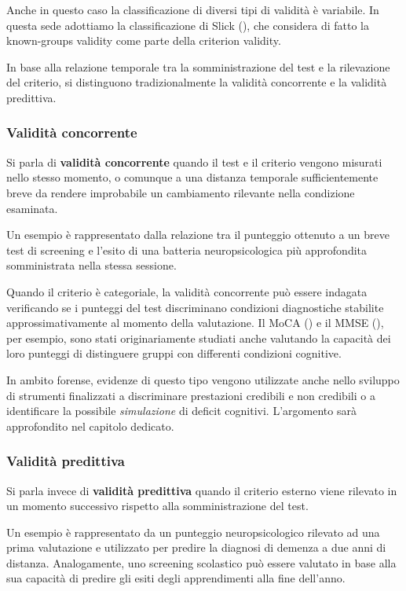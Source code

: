 \documentclass[
  italian,
  letterpaper,
  paper=A4,
  headinclude=on,
  footinclude=on,
  12pt]{scrbook}
\begin{document}
Anche in questo caso la classificazione di diversi tipi di validità è
variabile. In questa sede adottiamo la classificazione di Slick
(\cite{slick2006psychometrics}), che considera di fatto la known-groups
validity come parte della criterion validity.

In base alla relazione temporale tra la somministrazione del test e la
rilevazione del criterio, si distinguono tradizionalmente la validità
concorrente e la validità predittiva.

\subsubsection{Validità concorrente}\label{validituxe0-concorrente}

Si parla di \textbf{validità concorrente} quando il test e il criterio
vengono misurati nello stesso momento, o comunque a una distanza
temporale sufficientemente breve da rendere improbabile un cambiamento
rilevante nella condizione esaminata.

Un esempio è rappresentato dalla relazione tra il punteggio ottenuto a
un breve test di screening e l'esito di una batteria neuropsicologica
più approfondita somministrata nella stessa sessione.

Quando il criterio è categoriale, la validità concorrente può essere
indagata verificando se i punteggi del test discriminano condizioni
diagnostiche stabilite approssimativamente al momento della valutazione.
Il MoCA (\cite{nasreddine2005montreal}) e il MMSE
(\cite{folstein1975mini}), per esempio, sono stati originariamente
studiati anche valutando la capacità dei loro punteggi di distinguere
gruppi con differenti condizioni cognitive.

In ambito forense, evidenze di questo tipo vengono utilizzate anche
nello sviluppo di strumenti finalizzati a discriminare prestazioni
credibili e non credibili o a identificare la possibile
\emph{simulazione} di deficit cognitivi. L'argomento sarà approfondito
nel capitolo dedicato.

\subsubsection{Validità predittiva}\label{validituxe0-predittiva}

Si parla invece di \textbf{validità predittiva} quando il criterio
esterno viene rilevato in un momento successivo rispetto alla
somministrazione del test.

Un esempio è rappresentato da un punteggio neuropsicologico rilevato ad
una prima valutazione e utilizzato per predire la diagnosi di demenza a
due anni di distanza. Analogamente, uno screening scolastico può essere
valutato in base alla sua capacità di predire gli esiti degli
apprendimenti alla fine dell'anno.
\end{document}
